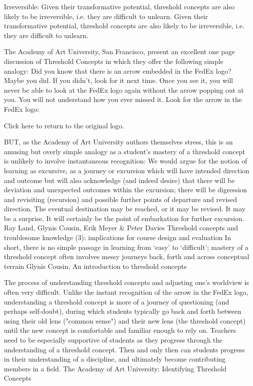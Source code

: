 \documentclass{tufte-book}\usepackage[]{graphicx}\usepackage[]{xcolor}
\begin{document}
Irreversible: Given their transformative potential, threshold concepts are also likely to be irreversible, i.e. they are difficult to unlearn. Given their transformative potential, threshold concepts are also likely to be irreversible, i.e. they are difficult to unlearn.

The Academy of Art University, San Francisco, present an excellent one page discussion of Threshold Concepts in which they offer the following simple analogy:
Did you know that there is an arrow embedded in the FedEx logo? Maybe you did. If you didn’t, look for it next time. Once you see it, you will never be able to look at the FedEx logo again without the arrow popping out at you. You will not understand how you ever missed it.
Look for the arrow in the FedEx logo:



Click here to return to the original logo.



BUT, as the Academy of Art University authors themselves stress, this is an amusing but overly simple analogy as a student's mastery of a threshold concept is unlikely to involve instantaneous recognition:
We would argue for the notion of learning as excursive, as a journey or excursion which will have intended direction and outcome but will also acknowledge (and indeed desire) that there will be deviation and unexpected outcomes within the excursion; there will be digression and revisiting (recursion) and possible further points of departure and revised direction. The eventual destination may be reached, or it may be revised. It may be a surprise. It will certainly be the point of embarkation for further excursion.
                                    Ray Land, Glynis Cousin, Erik Meyer \& Peter Davies
                                    Threshold concepts and troublesome knowledge (3): implications for course design and evaluation
In short, there is no simple passage in learning from ‘easy’ to ‘difficult’; mastery of a threshold concept often involves messy journeys back, forth and across conceptual terrain
                                    Glynis Cousin, An introduction to threshold concepts

The process of understanding threshold concepts and adjusting one's worldview is often very difficult. Unlike the instant recognition of the arrow in the FedEx logo, understanding a threshold concept is more of a journey of questioning (and perhaps self-doubt), during which students typically go back and forth between using their old lens ("common sense") and their new lens (the threshold concept) until the new concept is comfortable and familiar enough to rely on. Teachers need to be especially supportive of students as they progress through the understanding of a threshold concept. Then and only then can students progress in their understanding of a discipline, and ultimately become contributing members in a field.
                                    The Academy of Art University: Identifying Threshold Concepts
\end{document}
